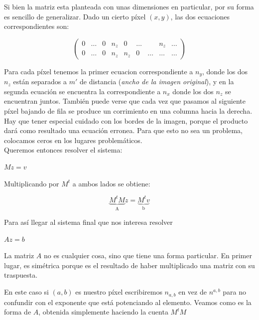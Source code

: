 Si bien la matriz esta planteada con unas dimensiones en particular, por su forma es sencillo de generalizar. Dado un cierto píxel $(x, y)$, las dos ecuaciones correspondientes son:

\[
\begin{pmatrix}
    0 & \dots & 0 & n_{z} & 0     & \dots &       & n_{z} & \dots  \\
    0 & \dots & 0 & n_{z} & n_{z} & 0     & \dots & \dots & \dots
\end{pmatrix}
\]

Para cada píxel tenemos la primer ecuacion correspondiente a $n_y$, donde los dos $n_z$ están separados a $m'$ de distancia (\textit{ancho de la imagen original}), y en la segunda ecuación se encuentra la correspondiente a $n_x$ donde los dos $n_z$ se encuentran juntos. También puede verse que cada vez que pasamos al siguiente píxel bajando de fila se produce un corrimiento en una columna hacia la derecha. Hay que tener especial cuidado con los bordes de la imagen, porque el producto dará como resultado una ecuación erronea. Para que esto no sea un problema, colocamos ceros en los lugares problemáticos. \\

Queremos entonces resolver el sistema:

\begin{center}
$M z = v$
\end{center}

Multiplicando por $M^{t}$ a ambos lados se obtiene:
\begin{center}
\[\underbrace{M^{t} M}_{\text{A}} z = \underbrace{M^{t} v}_{\text{b}}\]
\end{center}

Para así llegar al sistema final que nos interesa resolver
\begin{center}
$A z = b$
\end{center}

La matriz $A$ no es cualquier cosa, sino que tiene una forma particular. En primer lugar, es simétrica porque es el resultado de haber multiplicado una matriz con su traspuesta.

En este caso si $(a, b)$ es nuestro píxel escribiremos  $n_{a,b}$ en vez de $n^{a,b}$ para no confundir con el exponente que está potenciando al elemento. Veamos como es la forma de $A$, obtenida simplemente haciendo la cuenta $M^t M$


